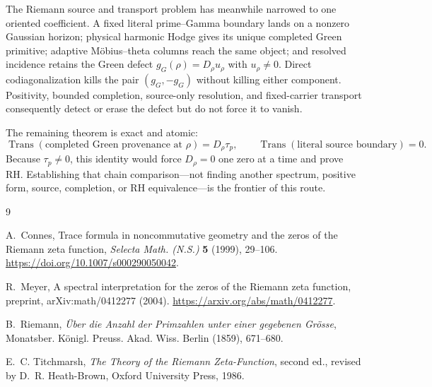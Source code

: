 \documentclass[11pt]{article}
\theoremstyle{definition}
\theoremstyle{remark}
\numberwithin{equation}{section}
\newcommand{\Trans}{\operatorname{Trans}}
\begin{document}
The Riemann source and transport problem has meanwhile narrowed to one
oriented coefficient.  A fixed literal prime--Gamma boundary lands on a
nonzero Gaussian horizon; physical harmonic Hodge gives its unique completed
Green primitive; adaptive M\"obius--theta columns reach the same object; and
resolved incidence retains the Green defect
$g_G(\rho)=D_\rho u_\rho$ with $u_\rho\ne0$.  Direct codiagonalization kills
the pair $(g_G,-g_G)$ without killing either component.  Positivity, bounded
completion, source-only resolution, and fixed-carrier transport consequently
detect or erase the defect but do not force it to vanish.

The remaining theorem is exact and atomic:
\[
 \boxed{
 \Trans(\text{completed Green provenance at }\rho)
       =D_\rho\tau_p,
 \qquad
 \Trans(\text{literal source boundary})=0.}
\]
Because $\tau_p\ne0$, this identity would force $D_\rho=0$ one zero at a
time and prove RH.  Establishing that chain comparison---not finding another
spectrum, positive form, source, completion, or RH equivalence---is the
frontier of this route.

\begin{thebibliography}{9}
\small

A.~Connes,
\newblock Trace formula in noncommutative geometry and the zeros of the
Riemann zeta function,
\newblock \emph{Selecta Math. (N.S.)} \textbf{5} (1999), 29--106.
\newblock \url{https://doi.org/10.1007/s000290050042}.

R.~Meyer,
\newblock A spectral interpretation for the zeros of the Riemann zeta
function,
\newblock preprint, arXiv:math/0412277 (2004).
\newblock \url{https://arxiv.org/abs/math/0412277}.

B.~Riemann,
\newblock \emph{\"Uber die Anzahl der Primzahlen unter einer gegebenen
Gr\"osse},
\newblock Monatsber. K\"onigl. Preuss. Akad. Wiss. Berlin (1859), 671--680.

E.~C. Titchmarsh,
\newblock \emph{The Theory of the Riemann Zeta-Function},
\newblock second ed., revised by D.~R. Heath-Brown, Oxford University Press,
1986.

\end{thebibliography}
\normalsize
\end{document}
